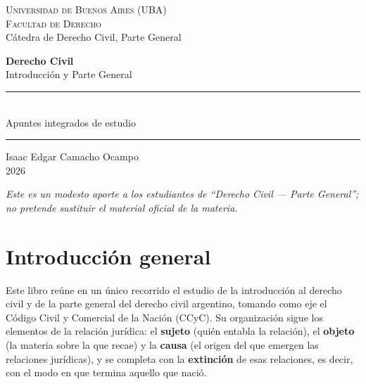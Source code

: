 \documentclass[12pt,oneside]{book}
\newcommand{\universidad}{Universidad de Buenos Aires (UBA)}
\newcommand{\facultad}{Facultad de Derecho}
\newcommand{\materia}{Derecho Civil}
\newcommand{\subtitulo}{Apuntes integrados de estudio}
\newcommand{\autor}{Isaac Edgar Camacho Ocampo}
\newcommand{\anio}{2026}
\begin{document}
\begin{titlepage}
\thispagestyle{empty}
\begin{center}
\vspace*{1cm}
{\large \textsc{\universidad}}\\[0.3cm]
{\large \textsc{\facultad}}\\[0.3cm]
{\large Cátedra de Derecho Civil, Parte General}

\vspace{3cm}
{\Huge \textbf{\materia}}\\[0.6cm]
{\LARGE Introducción y Parte General}

\vspace{1.2cm}
\rule{0.70\textwidth}{0.5pt}\\[0.5cm]
{\large \subtitulo}\\[0.5cm]
\rule{0.70\textwidth}{0.5pt}

\vfill
{\large \autor}\\[0.3cm]
{\large \anio}
\end{center}
\vfill
\begin{flushleft}
\textit{Este es un modesto aporte a los estudiantes de ``Derecho Civil --- Parte General''; no pretende sustituir el material oficial de la materia.}
\end{flushleft}
\end{titlepage}

\frontmatter
\tableofcontents

\chapter{Introducción general}

Este libro reúne en un único recorrido el estudio de la introducción al derecho civil y de la parte general del derecho civil argentino, tomando como eje el Código Civil y Comercial de la Nación (CCyC). Su organización sigue los elementos de la relación jurídica: el \textbf{sujeto} (quién entabla la relación), el \textbf{objeto} (la materia sobre la que recae) y la \textbf{causa} (el origen del que emergen las relaciones jurídicas), y se completa con la \textbf{extinción} de esas relaciones, es decir, con el modo en que termina aquello que nació.
\end{document}
